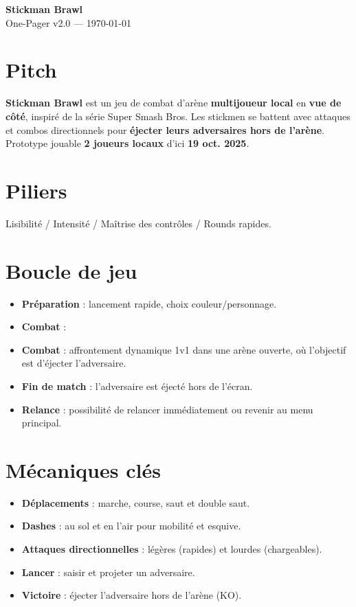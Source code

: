 \documentclass[10.8pt,letterpaper]{article}
\newcommand{\GameTitle}{Stickman Brawl}
\newcommand{\Subtitle}{One-Pager}
\newcommand{\Version}{v2.0 — \today}
\begin{document}
\begin{tcolorbox}
  {\Large \textbf{\GameTitle}}\\[-2pt]
  {\normalsize \Subtitle} \hfill {\footnotesize \Version}
\end{tcolorbox}

\begin{multicols}{2}

\section*{Pitch}
\textbf{Stickman Brawl} est un jeu de combat d'arène \textbf{multijoueur local} en \textbf{vue de côté}, inspiré de la série Super Smash Bros. Les stickmen se battent avec attaques et combos directionnels pour \textbf{éjecter leurs adversaires hors de l’arène}. Prototype jouable \textbf{2 joueurs locaux} d'ici \textbf{19 oct. 2025}.

\section*{Piliers}
Lisibilité / Intensité / Maîtrise des contrôles / Rounds rapides.

\section*{Boucle de jeu}
\begin{itemize}
  \item \textbf{Préparation} : lancement rapide, choix couleur/personnage.
  \item \textbf{Combat} : \item \textbf{Combat} : affrontement dynamique 1v1 dans une arène ouverte, où l’objectif est d’éjecter l’adversaire.
  \item \textbf{Fin de match} : l’adversaire est éjecté hors de l’écran.
  \item \textbf{Relance} : possibilité de relancer immédiatement ou revenir au menu principal.
\end{itemize}

\section*{Mécaniques clés}
\begin{itemize}
  \item \textbf{Déplacements} : marche, course, saut et double saut.
  \item \textbf{Dashes} : au sol et en l’air pour mobilité et esquive.
  \item \textbf{Attaques directionnelles} : légères (rapides) et lourdes (chargeables).
  \item \textbf{Lancer} : saisir et projeter un adversaire.
  \item \textbf{Victoire} : éjecter l’adversaire hors de l’arène (KO).
\end{itemize}


\end{multicols}
\end{document}

